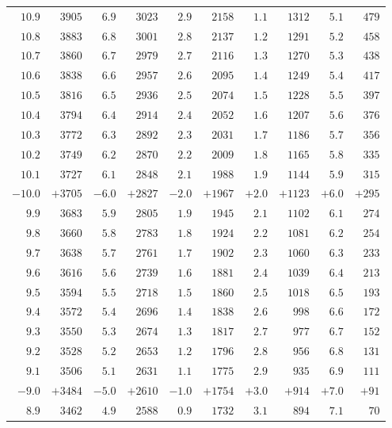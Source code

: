 \begin{center}
{\begin{tabular}{r|r||r|r||r|r||r|r||r|r}
$10.9$ & $3905$ & $6.9$ & $3023$ & $2.9$ & $2158$ & $1.1$ & $1312$ & $5.1$ & $479$\\
$10.8$ & $3883$ & $6.8$ & $3001$ & $2.8$ & $2137$ & $1.2$ & $1291$ & $5.2$ & $458$\\
$10.7$ & $3860$ & $6.7$ & $2979$ & $2.7$ & $2116$ & $1.3$ & $1270$ & $5.3$ & $438$\\
$10.6$ & $3838$ & $6.6$ & $2957$ & $2.6$ & $2095$ & $1.4$ & $1249$ & $5.4$ & $417$\\
$10.5$ & $3816$ & $6.5$ & $2936$ & $2.5$ & $2074$ & $1.5$ & $1228$ & $5.5$ & $397$\\
$10.4$ & $3794$ & $6.4$ & $2914$ & $2.4$ & $2052$ & $1.6$ & $1207$ & $5.6$ & $376$\\
$10.3$ & $3772$ & $6.3$ & $2892$ & $2.3$ & $2031$ & $1.7$ & $1186$ & $5.7$ & $356$\\
$10.2$ & $3749$ & $6.2$ & $2870$ & $2.2$ & $2009$ & $1.8$ & $1165$ & $5.8$ & $335$\\
$10.1$ & $3727$ & $6.1$ & $2848$ & $2.1$ & $1988$ & $1.9$ & $1144$ & $5.9$ & $315$\\[4pt]
$-10.0$ & $+3705$ & $-6.0$ & $+2827$ & $-2.0$ & $+1967$ & $+2.0$ & $+1123$ & $+6.0$ & $+295$\\
$9.9$ & $3683$ & $5.9$ & $2805$ & $1.9$ & $1945$ & $2.1$ & $1102$ & $6.1$ & $274$\\
$9.8$ & $3660$ & $5.8$ & $2783$ & $1.8$ & $1924$ & $2.2$ & $1081$ & $6.2$ & $254$\\
$9.7$ & $3638$ & $5.7$ & $2761$ & $1.7$ & $1902$ & $2.3$ & $1060$ & $6.3$ & $233$\\
$9.6$ & $3616$ & $5.6$ & $2739$ & $1.6$ & $1881$ & $2.4$ & $1039$ & $6.4$ & $213$\\
$9.5$ & $3594$ & $5.5$ & $2718$ & $1.5$ & $1860$ & $2.5$ & $1018$ & $6.5$ & $193$\\
$9.4$ & $3572$ & $5.4$ & $2696$ & $1.4$ & $1838$ & $2.6$ & $998$ & $6.6$ & $172$\\
$9.3$ & $3550$ & $5.3$ & $2674$ & $1.3$ & $1817$ & $2.7$ & $977$ & $6.7$ & $152$\\
$9.2$ & $3528$ & $5.2$ & $2653$ & $1.2$ & $1796$ & $2.8$ & $956$ & $6.8$ & $131$\\
$9.1$ & $3506$ & $5.1$ & $2631$ & $1.1$ & $1775$ & $2.9$ & $935$ & $6.9$ & $111$\\[4pt]
$-9.0$ & $+3484$ & $-5.0$ & $+2610$ & $-1.0$ & $+1754$ & $+3.0$ & $+914$ & $+7.0$ & $+91$\\
$8.9$ & $3462$ & $4.9$ & $2588$ & $0.9$ & $1732$ & $3.1$ & $894$ & $7.1$ & $70$\\

\end{tabular}}
\end{center}
